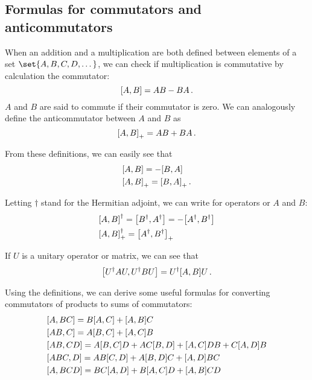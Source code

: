 \subsection{Formulas for commutators and anticommutators}
        When an addition and a multiplication are both defined between elements of a set $\set{A, B, C, D, \dots}$, we can check if multiplication is commutative by calculation the commutator:
        \begin{equation}
            \comm{A}{B} = AB - BA \thinspace .
        \end{equation}
        $A$ and $B$ are said to commute if their commutator is zero. We can analogously define the anticommutator between $A$ and $B$ as
        \begin{equation}
            \comm{A}{B}_+ = AB + BA \thinspace .
        \end{equation}

        From these definitions, we can easily see that
        \begin{align}
            & \comm{A}{B} = - \comm{B}{A} \\
            & \comm{A}{B}_+ = \comm{B}{A}_+ \thinspace .
        \end{align}

        Letting $\dagger$ stand for the Hermitian adjoint, we can write for operators or $A$ and $B$:
        \begin{align}
            & \comm{A}{B}^\dagger = \comm{B^\dagger}{A^\dagger} = - \comm{A^\dagger}{B^\dagger} \\
            & \comm{A}{B}^\dagger_+ = \comm{A^\dagger}{B^\dagger}_+
        \end{align}

        If $U$ is a unitary operator or matrix, we can see that
        \begin{equation}
            \comm{U^\dagger A U}{U^\dagger B U } = U^\dagger \comm{A}{B} U \thinspace .
        \end{equation}

        Using the definitions, we can derive some useful formulas for converting commutators of products to sums of commutators:
        \begin{align}
            & \comm{A}{BC} = B \comm{A}{C} + \comm{A}{B} C \\
            & \comm{AB}{C} = A \comm{B}{C} + \comm{A}{C}B \\
            & \comm{AB}{CD} = A \comm{B}{C} D + AC \comm{B}{D} + \comm{A}{C} DB + C \comm{A}{D} B \\
            & \comm{ABC}{D} = AB \comm{C}{D} + A \comm{B}{D} C + \comm{A}{D} BC \\
            & \comm{A}{BCD} = BC \comm{A}{D} + B \comm{A}{C} D + \comm{A}{B} CD
        \end{align}

